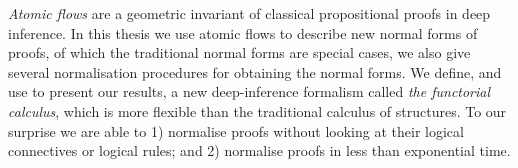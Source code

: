 \emph{Atomic flows} are a geometric invariant of classical propositional proofs in deep inference. In this thesis we use atomic flows to describe new normal forms of proofs, of which the traditional normal forms are special cases, we also give several normalisation procedures for obtaining the normal forms. We define, and use to present our results, a new deep-inference formalism called \emph{the functorial calculus}, which is more flexible than the traditional calculus of structures. To our surprise we are able to 1) normalise proofs without looking at their logical connectives or logical rules; and 2) normalise proofs in less than exponential time.